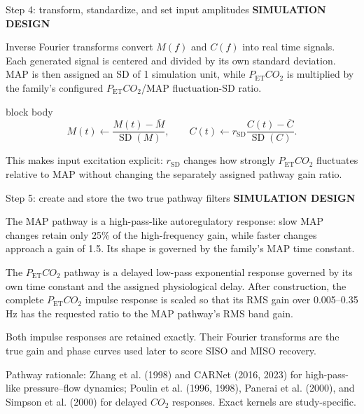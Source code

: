 \documentclass[aspectratio=169,11pt]{beamer}
\newcommand{\PETCOtwo}{P_{\mathrm{ET}}CO_2}
\newcommand{\sectionlabel}[1]{%
  {\color{Accent}\fontsize{8}{9.5}\selectfont\bfseries\MakeUppercase{#1}}\par\vspace{0.12cm}}
\newcommand{\sourcefooter}[1]{%
  \par\vfill{\color{Muted}\fontsize{6.8}{8}\selectfont #1}}
\newenvironment{equationcallout}
  {\begin{beamercolorbox}[rounded=true,sep=0.28cm,center,wd=0.94\textwidth]{block body}%
   \setbeamercolor{block body}{bg=AccentLight,fg=Ink}\large}
  {\end{beamercolorbox}}
\begin{document}
\begin{frame}{Step 4: transform, standardize, and set input amplitudes}
\sectionlabel{Simulation Design}
Inverse Fourier transforms convert $M(f)$ and $C(f)$ into real time signals.
Each generated signal is centered and divided by its own standard deviation.
MAP is then assigned an SD of 1 simulation unit, while $\PETCOtwo$ is multiplied
by the family's configured $\PETCOtwo$/MAP fluctuation-SD ratio.

\vspace{0.28cm}
\begin{equationcallout}
\[
M(t)\leftarrow \frac{M(t)-\overline M}{\operatorname{SD}(M)},
\qquad
C(t)\leftarrow r_{\mathrm{SD}}
\frac{C(t)-\overline C}{\operatorname{SD}(C)}.
\]
\end{equationcallout}

\vspace{0.18cm}
This makes input excitation explicit: $r_{\mathrm{SD}}$ changes how strongly
$\PETCOtwo$ fluctuates relative to MAP without changing the separately assigned
pathway gain ratio.
\end{frame}

\begin{frame}{Step 5: create and store the two true pathway filters}
\sectionlabel{Simulation Design}
The MAP pathway is a high-pass-like autoregulatory response: slow MAP changes
retain only 25\% of the high-frequency gain, while faster changes approach a
gain of 1.5. Its shape is governed by the family's MAP time constant.

\vspace{0.30cm}
The $\PETCOtwo$ pathway is a delayed low-pass exponential response governed by
its own time constant and the assigned physiological delay. After construction,
the complete $\PETCOtwo$ impulse response is scaled so that its RMS gain over
0.005--0.35 Hz has the requested ratio to the MAP pathway's RMS band gain.

\vspace{0.30cm}
Both impulse responses are retained exactly. Their Fourier transforms are the
true gain and phase curves used later to score SISO and MISO recovery.
\sourcefooter{Pathway rationale: Zhang et al. (1998) and CARNet (2016, 2023) for high-pass-like pressure--flow dynamics; Poulin et al. (1996, 1998), Panerai et al. (2000), and Simpson et al. (2000) for delayed $CO_2$ responses. Exact kernels are study-specific.}
\end{frame}
\end{document}
